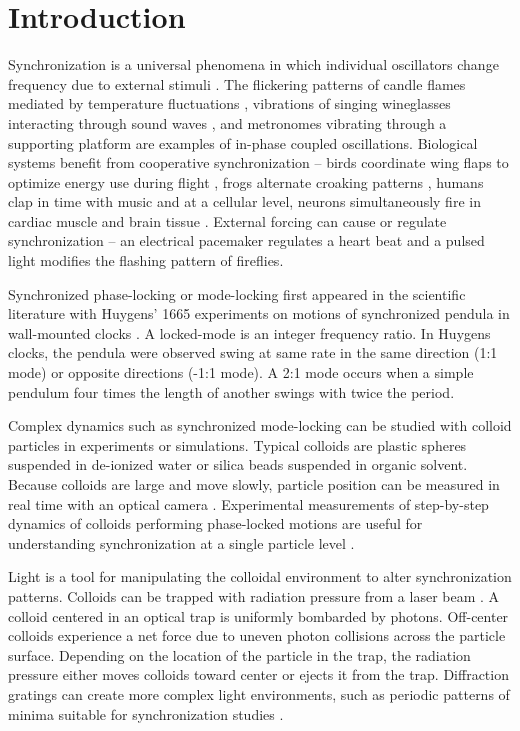 \documentclass[twocolumn,preprintnumbers,amsmath,amssymb,aps,prb]{revtex4}
\begin{document}
\section{Introduction} 
Synchronization is a universal phenomena
in which
individual oscillators change frequency due
to external stimuli \cite{Pikovsky2003}.
The
flickering patterns of
candle flames mediated by temperature fluctuations \cite{Okamoto2016},
vibrations of singing wineglasses interacting 
through sound waves \cite{Arane2009}, 
and metronomes vibrating through a supporting platform \cite{Jia2015}
are examples of in-phase coupled oscillations. 
Biological systems benefit from cooperative
synchronization --
birds coordinate wing flaps
to optimize energy use during flight \cite{Portugal2014},
frogs alternate croaking patterns \cite{Aihara2014},
humans clap in time with music \cite{Tranchant2016}
and 
at a cellular level, 
neurons simultaneously fire in cardiac muscle \cite{MartinHall1999}
and brain tissue \cite{Singer1999}.
External forcing can cause or regulate 
synchronization -- 
an electrical pacemaker 
regulates a heart beat 
and 
a pulsed light modifies the
flashing pattern of fireflies. 

Synchronized phase-locking or mode-locking 
first appeared in the scientific literature
with 
Huygens' 1665 experiments on
motions of synchronized 
pendula in wall-mounted clocks \cite{Bennett2002}.
A locked-mode is an integer frequency ratio.
In Huygens clocks,
the pendula were observed swing at same rate
in the same direction (1:1 mode) or
opposite directions (-1:1 mode).
A 2:1 mode occurs when a simple pendulum four
times the length of another swings with twice the period.

Complex dynamics such as synchronized mode-locking
can be studied with
colloid particles in experiments or simulations.
Typical colloids are   
plastic spheres suspended in
de-ionized water or silica beads suspended in organic solvent.
Because 
colloids are large 
and move slowly, 
particle position 
can be measured in real time 
with an optical camera \cite{Pertsinidis2001}. 
Experimental measurements of 
step-by-step dynamics of 
colloids performing phase-locked motions
are useful for
understanding synchronization at a single particle level \cite{Juniper2015,Juniper2017}. 

Light is a
tool for manipulating the colloidal environment
to alter synchronization patterns.
Colloids can be trapped
with 
radiation pressure from 
a laser beam \cite{Ashkin1997}.
A colloid centered in an optical trap is 
uniformly bombarded by photons. 
Off-center colloids 
experience a net force
due to uneven photon collisions across
the particle surface.
Depending on the 
location of the particle in the trap,
the radiation pressure either moves colloids toward center 
or ejects it from the trap.
Diffraction gratings can create
more complex light environments, 
such as periodic patterns of minima
suitable for synchronization studies \cite{Grier2003}.
\end{document}
